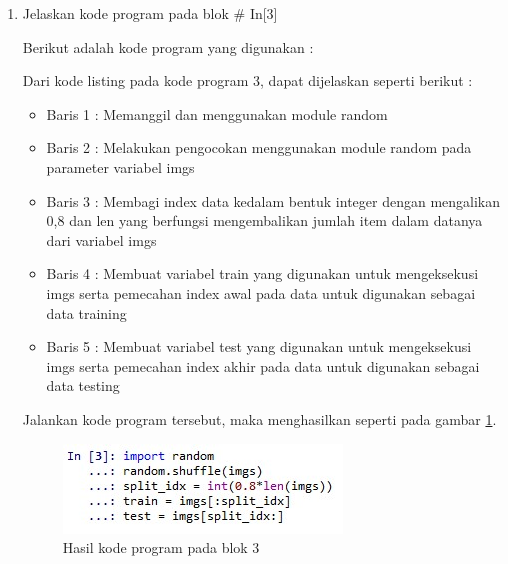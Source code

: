 \begin{enumerate}
\item Jelaskan kode program pada blok \# In[3]
	\par Berikut adalah kode program yang digunakan :
	
	\par Dari kode listing pada kode program 3, dapat dijelaskan seperti berikut :
	\begin{itemize}
	\item Baris 1	: Memanggil dan menggunakan module random
	\item Baris 2	: Melakukan pengocokan menggunakan module random pada parameter variabel imgs
	\item Baris 3	: Membagi index data kedalam bentuk integer dengan mengalikan 0,8 dan len yang berfungsi mengembalikan jumlah item dalam datanya dari variabel imgs
	\item Baris 4	: Membuat variabel train yang digunakan untuk mengeksekusi imgs serta pemecahan index awal pada data untuk digunakan sebagai data training
	\item Baris 5	: Membuat variabel test yang digunakan untuk mengeksekusi imgs serta pemecahan index akhir pada data untuk digunakan sebagai data testing
	\end{itemize}
	\par Jalankan kode program tersebut, maka menghasilkan seperti pada gambar \ref{andri3}.
		\begin{figure}[!hbtp]
		\centering
		\includegraphics[scale=0.5]{figures/chapter7/andri3.jpg}
		\caption{Hasil kode program pada blok 3}
		\label{andri3}
		\end{figure}
	

\end{enumerate}
